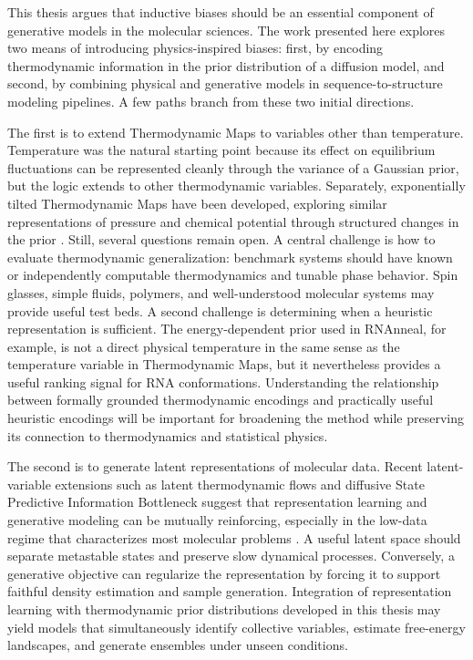
\label{ch7:outlook}

This thesis argues that inductive biases should be an essential component of generative models in the molecular sciences. The work presented here explores two means of introducing physics-inspired biases: first, by encoding thermodynamic information in the prior distribution of a diffusion model, and second, by combining physical and generative models in sequence-to-structure modeling pipelines. A few paths branch from these two initial directions.

The first is to extend Thermodynamic Maps to variables other than temperature. Temperature was the natural starting point because its effect on equilibrium fluctuations can be represented cleanly through the variance of a Gaussian prior, but the logic extends to other thermodynamic variables. Separately, exponentially tilted Thermodynamic Maps have been developed, exploring similar representations of pressure and chemical potential through structured changes in the prior \citep{exptm}. Still, several questions remain open. A central challenge is how to evaluate thermodynamic generalization: benchmark systems should have known or independently computable thermodynamics and tunable phase behavior. Spin glasses, simple fluids, polymers, and well-understood molecular systems may provide useful test beds. A second challenge is determining when a heuristic representation is sufficient. The energy-dependent prior used in RNAnneal, for example, is not a direct physical temperature in the same sense as the temperature variable in Thermodynamic Maps, but it nevertheless provides a useful ranking signal for RNA conformations. Understanding the relationship between formally grounded thermodynamic encodings and practically useful heuristic encodings will be important for broadening the method while preserving its connection to thermodynamics and statistical physics.

The second is to generate latent representations of molecular data. Recent latent-variable extensions such as latent thermodynamic flows and diffusive State Predictive Information Bottleneck suggest that representation learning and generative modeling can be mutually reinforcing, especially in the low-data regime that characterizes most molecular problems \citep{latf2026,john2025dspib}. A useful latent space should separate metastable states and preserve slow dynamical processes. Conversely, a generative objective can regularize the representation by forcing it to support faithful density estimation and sample generation. Integration of representation learning with thermodynamic prior distributions developed in this thesis may yield models that simultaneously identify collective variables, estimate free-energy landscapes, and generate ensembles under unseen conditions.

